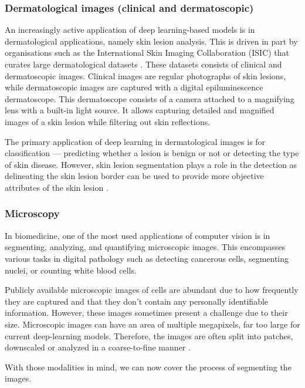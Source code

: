 \subsubsection{Dermatological images (clinical and dermatoscopic)}

An increasingly active application of deep learning-based models is in dermatological applications, namely skin lesion analysis. This is driven in part by organisations such as the International Skin Imaging Collaboration (ISIC) that curates large dermatological datasets \cite{rotembergPatientcentricDatasetImages2021}. These datasets consists of clinical and dermatoscopic images. Clinical images are regular photographs of skin lesions, while dermatoscopic images are captured with a digital epiluminescence dermatoscope. This dermatoscope consists of a camera attached to a magnifying lens with a built-in light source. It allows capturing detailed and magnified images of a skin lesion while filtering out skin reflections.

The primary application of deep learning in dermatological images is for classification --- predicting whether a lesion is benign or not or detecting the type of skin disease. However, skin lesion segmentation plays a role in the detection as delineating the skin lesion border can be used to provide more objective attributes of the skin lesion \cite{rotembergPatientcentricDatasetImages2021}.

\subsubsection{Microscopy}

In biomedicine, one of the most used applications of computer vision is in segmenting, analyzing, and quantifying microscopic images. This encompasses various tasks in digital pathology such as detecting cancerous cells, segmenting nuclei, or counting white blood cells.

Publicly available microscopic images of cells are abundant due to how frequently they are captured and that they don't contain any personally identifiable information. However, these images sometimes present a challenge due to their size. Microscopic images can have an area of multiple megapixels, far too large for current deep-learning models. Therefore, the images are often split into patches, downscaled or analyzed in a coarse-to-fine manner \cite{jhaInstanceSegmentationWhole2021a}.

With those modalities in mind, we can now cover the process of segmenting the images.

